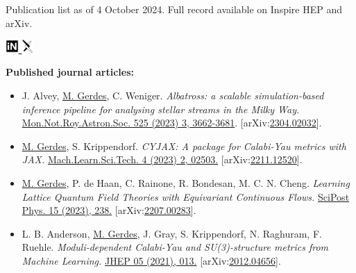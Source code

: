 \documentclass[12pt]{article}
\title{}
\author{}
\date{}
\begin{document}
\thispagestyle{firstpagestyle}

Publication list as of 4 October 2024. Full record available on Inspire HEP and arXiv.

{\hfill \small
\href{https://inspirehep.net/authors/2107097}{\includegraphics[height=14pt]{inspire.pdf} \hspace*{-7pt} } \hspace*{10pt}
\href{https://arxiv.org/a/gerdes_m_1.html}{\includegraphics[height=14pt]{arxiv.pdf} \hspace*{-10pt} }
}

\textbf{Published journal articles:}

\begin{itemize}[left=0pt, itemsep=5pt]
    \item J. Alvey, \underline{M. Gerdes}, C. Weniger.
    \textit{Albatross: a scalable simulation-based inference pipeline for analysing stellar streams in the Milky Way.}
    \href{https://doi.org/10.1093/mnras/stad2458}{Mon.Not.Roy.Astron.Soc. 525 (2023) 3, 3662-3681}.
    [arXiv:\href{https://arxiv.org/abs/2304.02032}{2304.02032}].

    \item \underline{M. Gerdes}, S. Krippendorf.
    \textit{CYJAX: A package for Calabi-Yau metrics with JAX.}
    \newline \href{https://doi.org/10.1088/2632-2153/acdc84}{Mach.Learn.Sci.Tech. 4 (2023) 2, 02503.}
    [arXiv:\href{https://arxiv.org/abs/2211.12520}{2211.12520}].

    \item \underline{M. Gerdes}, P. de Haan, C. Rainone, R. Bondesan, M. C. N. Cheng.
    \textit{Learning Lattice Quantum Field Theories with Equivariant Continuous Flows.}
    \href{https://doi.org/10.21468/SciPostPhys.15.6.238}{SciPost Phys. 15 (2023), 238.}
    [arXiv:\href{https://arxiv.org/abs/2207.00283}{2207.00283}].

    \item L. B. Anderson, \underline{M. Gerdes}, J. Gray, S. Krippendorf, N. Raghuram, F. Ruehle.
    \linebreak \textit{Moduli-dependent Calabi-Yau and SU(3)-structure metrics from Machine Learning.}
    \href{https://doi.org/10.1007/JHEP05(2021)013}{JHEP 05 (2021), 013.}
    [arXiv:\href{https://arxiv.org/abs/2012.04656}{2012.04656}].
\end{itemize}
\end{document}
